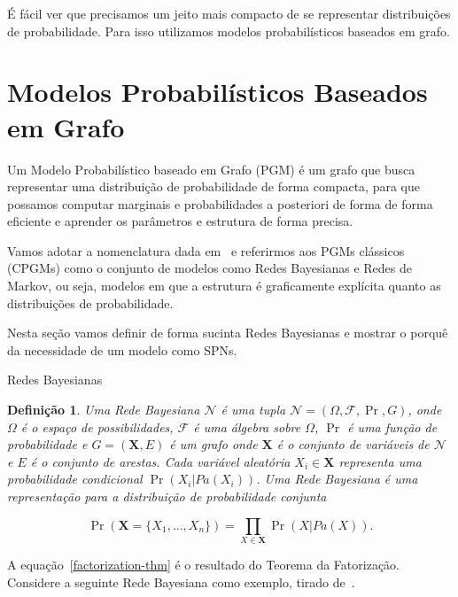 \documentclass{amsart}
\makeatletter
\def\subsection{\@startsection{subsection}{3}%
  \z@{.5\linespacing\@plus.7\linespacing}{.1\linespacing}%
  {\normalfont\itshape}}
\theoremstyle{plain}
\newcounter{dummy-def}\numberwithin{dummy-def}{subsection}
\newtheorem{definition}[dummy-def]{Definição}
\newcounter{dummy-thm}\numberwithin{dummy-thm}{subsection}
\newcounter{dummy-prop}\numberwithin{dummy-prop}{subsection}
\newcounter{dummy-ex}\numberwithin{dummy-ex}{subsection}
\newcounter{dummy-eg}\numberwithin{dummy-eg}{subsection}
\numberwithin{equation}{subsection}
\newcommand{\set}[1]{\mathbf{#1}}
\makeatother
\begin{document}
É fácil ver que precisamos um jeito mais compacto de se representar distribuições de probabilidade.
Para isso utilizamos modelos probabilísticos baseados em grafo.

\section{Modelos Probabilísticos Baseados em Grafo}

Um Modelo Probabilístico baseado em Grafo (PGM) é um grafo que busca representar uma distribuição
de probabilidade de forma compacta, para que possamos computar marginais e probabilidades
a posteriori de forma de forma eficiente e aprender os parâmetros e estrutura de forma precisa.

Vamos adotar a nomenclatura dada em~\cite{peharz-spn} e referirmos aos PGMs clássicos (CPGMs)
como o conjunto de modelos como Redes Bayesianas e Redes de Markov, ou seja, modelos em que a
estrutura é graficamente explícita quanto as distribuições de probabilidade.

Nesta seção vamos definir de forma sucinta Redes Bayesianas e mostrar o porquê da necessidade de um
modelo como SPNs.

\subsection{Redes Bayesianas}

\begin{definition}
  Uma Rede Bayesiana $\mathcal{N}$ é uma tupla $\mathcal{N}=(\Omega,\mathcal{F},\Pr,G)$, onde
  $\Omega$ é o espaço de possibilidades, $\mathcal{F}$ é uma álgebra sobre $\Omega$, $\Pr$ é uma
  função de probabilidade e $G=(\set{X},E)$ é um grafo onde $\set{X}$ é o conjunto de variáveis de
  $\mathcal{N}$ e $E$ é o conjunto de arestas. Cada variável aleatória $X_i\in\set{X}$ representa
  uma probabilidade condicional $\Pr(X_i|Pa(X_i))$. Uma Rede Bayesiana é uma representação para a
  distribuição de probabilidade conjunta

  \begin{equation}\label{factorization-thm}
    \Pr(\set{X}=\{X_1,\ldots,X_n\})=\prod_{X\in\set{X}} \Pr(X|Pa(X)).
  \end{equation}
\end{definition}

A equação~\ref{factorization-thm} é o resultado do Teorema da Fatorização. Considere a seguinte
Rede Bayesiana como exemplo, tirado de~\cite{bayes-net-darwiche}.
\end{document}
